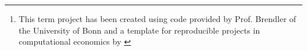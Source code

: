 \begin{abstract}

Some abstract here.\footnote{This term project has been created using code provided by Prof. Brendler of the University of Bonn and a template for reproducible projects in computational economics by \citet{GaudeckerEconProjectTemplates}}

\end{abstract}
